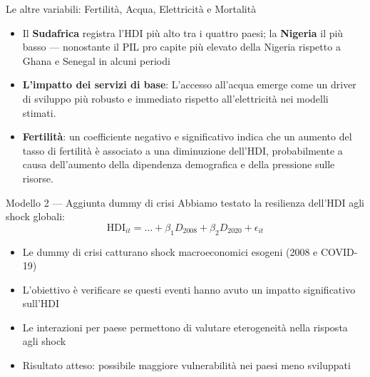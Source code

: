 \documentclass[
  ignorenonframetext,
  aspectratio=43,
]{beamer}
\begin{document}
\begin{frame}{Le altre variabili: Fertilità, Acqua, Elettricità e
Mortalità}
\label{le-altre-variabili-fertilituxe0-acqua-elettricituxe0-e-mortalituxe0}
\begin{itemize}
  \item Il \textbf{Sudafrica} registra l'HDI più alto tra i quattro paesi; la \textbf{Nigeria} il più basso — nonostante il PIL pro capite più elevato della Nigeria rispetto a Ghana e Senegal in alcuni periodi
  \item \textbf{L'impatto dei servizi di base}: L'accesso all'acqua emerge come un driver di sviluppo più robusto e immediato rispetto all'elettricità nei modelli stimati.
  \item \textbf{Fertilità}: un coefficiente negativo e significativo indica che un aumento del tasso di fertilità è associato a una diminuzione dell'HDI, probabilmente a causa dell'aumento della dipendenza demografica e della pressione sulle risorse.
\end{itemize}
\end{frame}

\begin{frame}{Modello 2 --- Aggiunta dummy di crisi}
\label{modello-2-aggiunta-dummy-di-crisi}
Abbiamo testato la resilienza dell'HDI agli shock globali:
\[\text{HDI}_{it} = \dots + \beta_1 D_{2008} + \beta_2 D_{2020} + \epsilon_{it}\]

\begin{itemize}
  \item Le dummy di crisi catturano shock macroeconomici esogeni (2008 e COVID-19)
  \item L’obiettivo è verificare se questi eventi hanno avuto un impatto significativo sull’HDI
  \item Le interazioni per paese permettono di valutare eterogeneità nella risposta agli shock
  \item Risultato atteso: possibile maggiore vulnerabilità nei paesi meno sviluppati
\end{itemize}
\end{frame}
\end{document}
